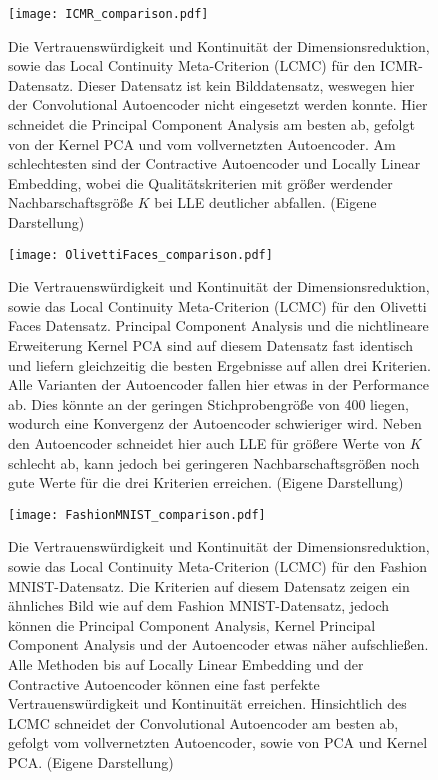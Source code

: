 \begin{figure}[ht]
	\begin{center}
		\texttt{[image: ICMR\_comparison.pdf]}
	\end{center}
	\caption[Qualitätskriterien für den ICMR-Datensatz]{Die Vertrauenswürdigkeit und Kontinuität der Dimensionsreduktion, sowie das Local Continuity Meta-Criterion (LCMC) für den ICMR-Datensatz. Dieser Datensatz ist kein Bilddatensatz, weswegen hier der Convolutional Autoencoder nicht eingesetzt werden konnte. Hier schneidet die Principal Component Analysis am besten ab, gefolgt von der Kernel PCA und vom vollvernetzten Autoencoder. Am schlechtesten sind der Contractive Autoencoder und Locally Linear Embedding, wobei die Qualitätskriterien mit größer werdender Nachbarschaftsgröße $K$ bei LLE deutlicher abfallen. (Eigene Darstellung)}
	\label{fig:ICMRMetrics}
\end{figure}

\begin{figure}[ht]
	\begin{center}
		\texttt{[image: OlivettiFaces\_comparison.pdf]}
	\end{center}
	\caption[Qualitätskriterien für den Olivetti Faces-Datensatz]{Die Vertrauenswürdigkeit und Kontinuität der Dimensionsreduktion, sowie das Local Continuity Meta-Criterion (LCMC) für den Olivetti Faces Datensatz. Principal Component Analysis und die nichtlineare Erweiterung Kernel PCA sind auf diesem Datensatz fast identisch und liefern gleichzeitig die besten Ergebnisse auf allen drei Kriterien. Alle Varianten der Autoencoder fallen hier etwas in der Performance ab. Dies könnte an der geringen Stichprobengröße von 400 liegen, wodurch eine Konvergenz der Autoencoder schwieriger wird. Neben den Autoencoder schneidet hier auch LLE für größere Werte von $K$ schlecht ab, kann jedoch bei geringeren Nachbarschaftsgrößen noch gute Werte für die drei Kriterien erreichen. (Eigene Darstellung)}
	\label{fig:OlivettiFacesMetrics}
\end{figure}

\begin{figure}[ht]
	\begin{center}
		\texttt{[image: FashionMNIST\_comparison.pdf]}
	\end{center}
	\caption[Qualitätskriterien für den Fashion MNIST-Datensatz]{Die Vertrauenswürdigkeit und Kontinuität der Dimensionsreduktion, sowie das Local Continuity Meta-Criterion (LCMC) für den Fashion MNIST-Datensatz. Die Kriterien auf diesem Datensatz zeigen ein ähnliches Bild wie auf dem Fashion MNIST-Datensatz, jedoch können die Principal Component Analysis, Kernel Principal Component Analysis und der Autoencoder etwas näher aufschließen. Alle Methoden bis auf Locally Linear Embedding und der Contractive Autoencoder können eine fast perfekte Vertrauenswürdigkeit und Kontinuität erreichen. Hinsichtlich des LCMC schneidet der Convolutional Autoencoder am besten ab, gefolgt vom vollvernetzten Autoencoder, sowie von PCA und Kernel PCA. (Eigene Darstellung)}
	\label{fig:FashionMNISTMetrics}
\end{figure}

